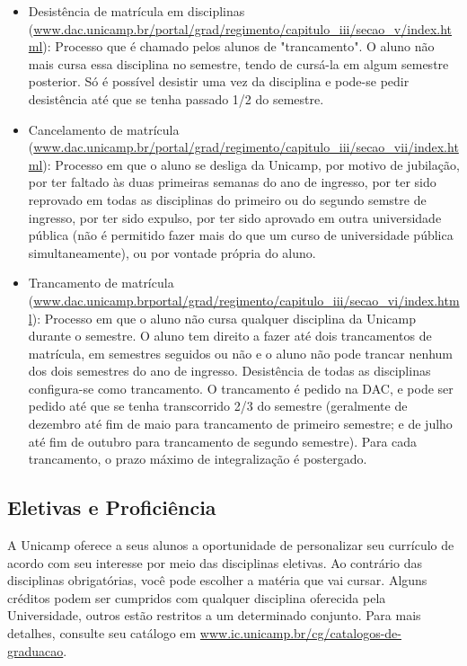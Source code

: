 \begin{itemize}
\item Desistência de matrícula em disciplinas
      (\url{www.dac.unicamp.br/portal/grad/regimento/capitulo_iii/secao_v/index.html}):
      Processo que é chamado pelos alunos de "trancamento".
      O aluno não mais cursa essa disciplina no semestre,
      tendo de cursá-la em algum semestre posterior. Só é possível desistir uma vez da
      disciplina e pode-se pedir desistência até que se tenha passado 1/2 do
      semestre.
\item Cancelamento de matrícula
      (\url{www.dac.unicamp.br/portal/grad/regimento/capitulo_iii/secao_vii/index.html}):
      Processo em que o aluno se desliga da Unicamp, por motivo de jubilação, por
      ter faltado às duas primeiras semanas do ano de ingresso, por ter sido
      reprovado em todas as disciplinas do primeiro ou do segundo semstre de
      ingresso, por ter sido expulso, por ter sido aprovado em outra universidade
      pública (não é permitido fazer mais do que um curso de universidade pública
      simultaneamente), ou por vontade própria do aluno.
\item Trancamento de matrícula
      (\url{www.dac.unicamp.brportal/grad/regimento/capitulo_iii/secao_vi/index.html}):
      Processo em que o aluno não cursa qualquer disciplina da Unicamp durante
      o semestre. O aluno tem direito a fazer até dois trancamentos de matrícula, em
      semestres seguidos ou não e o aluno não pode trancar nenhum dos dois
      semestres do ano de ingresso. Desistência de todas as disciplinas
      configura-se como trancamento. O trancamento é pedido na DAC, e pode ser
      pedido até que se tenha transcorrido 2/3 do semestre (geralmente de dezembro
      até fim de maio para trancamento de primeiro semestre; e de julho até fim de
      outubro para trancamento de segundo semestre). Para cada trancamento,
      o prazo máximo de integralização é postergado.
\end{itemize}

\subsection{Eletivas e Proficiência}

A Unicamp oferece a seus alunos a oportunidade de personalizar seu currículo de
acordo com seu interesse por meio das disciplinas eletivas. Ao contrário das
disciplinas obrigatórias, você pode escolher a matéria que vai cursar. Alguns
créditos podem ser cumpridos com qualquer disciplina oferecida pela
Universidade, outros estão restritos a um determinado conjunto. Para mais
detalhes, consulte seu catálogo em
\url{www.ic.unicamp.br/cg/catalogos-de-graduacao}.

